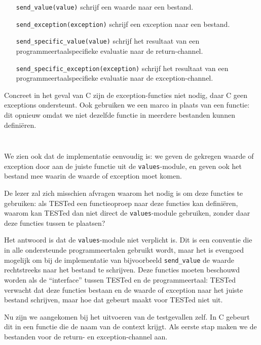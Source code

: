 \begin{itemize}
    \item[\texttt{send\_value(value)}] schrijf een waarde naar een bestand.
    \item[\texttt{send\_exception(exception)}] schrijf een exception naar een bestand.
    \item[\texttt{send\_specific\_value(value)}] schrijf het resultaat van een programmeertaalspecifieke evaluatie naar de return-channel.
    \item[\texttt{send\_specific\_exception(exception)}] schrijf het resultaat van een programmeertaalspecifieke evaluatie naar de exception-channel.
\end{itemize}

Concreet in het geval van C zijn de exception-functies niet nodig, daar C geen exceptions ondersteunt.
Ook gebruiken we een marco in plaats van een functie: dit opnieuw omdat we niet dezelfde functie in meerdere bestanden kunnen definiëren.

\inputminted[firstline=25,lastline=27]{mako}{sources/c-context.mako}
\vspace{-1.7cm} %
\inputminted[firstline=29,lastline=30]{mako}{sources/c-context.mako}

We zien ook dat de implementatie eenvoudig is: we geven de gekregen waarde of exception door aan de juiste functie uit de \texttt{values}-module, en geven ook het bestand mee waarin de waarde of exception moet komen.

De lezer zal zich misschien afvragen waarom het nodig is om deze functies te gebruiken: als TESTed een functieoproep naar deze functies kan definiëren, waarom kan TESTed dan niet direct de \texttt{values}-module gebruiken, zonder daar deze functies tussen te plaatsen?

Het antwoord is dat de \texttt{values}-module niet verplicht is.
Dit is een conventie die in alle ondersteunde programmeertalen gebruikt wordt, maar het is evengoed mogelijk om bij de implementatie van bijvoorbeeld \texttt{send\_value} de waarde rechtstreeks naar het bestand te schrijven.
Deze functies moeten beschouwd worden als de ``interface'' tussen TESTed en de programmeertaal: TESTed verwacht dat deze functies bestaan en de waarde of exception naar het juiste bestand schrijven, maar hoe dat gebeurt maakt voor TESTed niet uit.

Nu zijn we aangekomen bij het uitvoeren van de testgevallen zelf.
In C gebeurt dit in een functie die de naam van de context krijgt.
Als eerste stap maken we de bestanden voor de return- en exception-channel aan.

